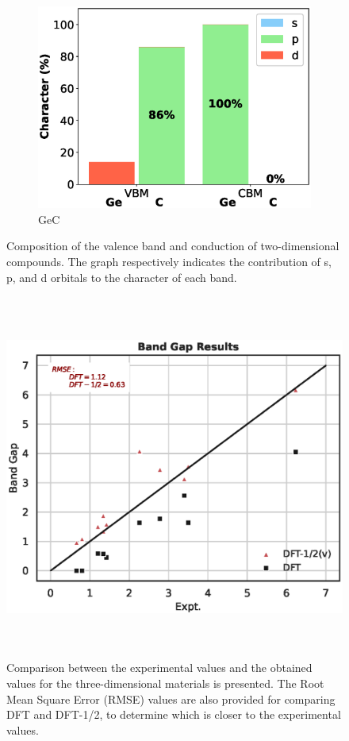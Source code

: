 \begin{figure}[!ht]
\begin{subfigure}{0.3\textwidth}
  \includegraphics[width=\linewidth]{images/gec_2d_composition.eps}
  \caption{GeC}
\end{subfigure}\hfil %
        \caption{Composition of the valence band and conduction of two-dimensional compounds. The graph respectively indicates the contribution of s, p, and d orbitals to the character of each band.}
        \label{fig:2d_compounds_character}
\end{figure}
\begin{figure}[!ht]
        \centering
        \includegraphics[width=16cm,height=12cm]{images/3d_comparison.eps}
        \caption{Comparison between the experimental values and the obtained values for the three-dimensional materials is presented. The Root Mean Square Error (RMSE) values are also provided for comparing DFT and DFT-1/2, to determine which is closer to the experimental values.}
        \label{fig:3d_comparison}
\end{figure}
